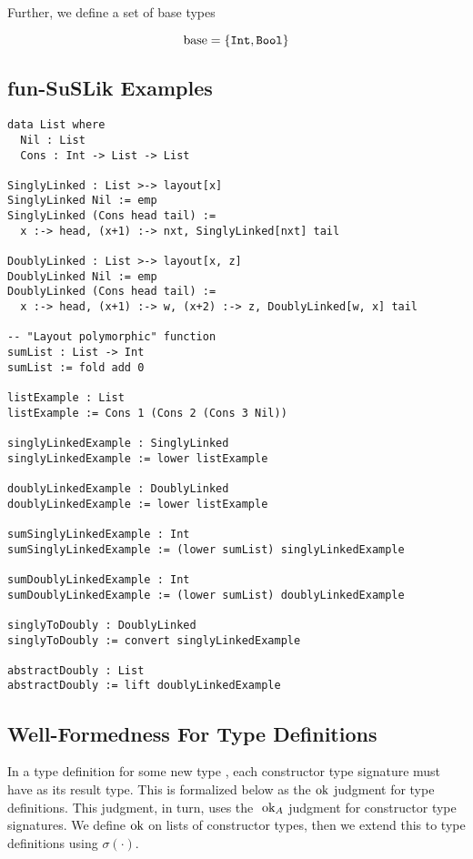\documentclass[10pt]{article}
\begin{document}
Further, we define a set of base types

\[
  \textnormal{base} = \{\texttt{Int}, \texttt{Bool}\}
\]

\subsection{fun-SuSLik Examples}

\begin{lstlisting}
data List where
  Nil : List
  Cons : Int -> List -> List

SinglyLinked : List >-> layout[x]
SinglyLinked Nil := emp
SinglyLinked (Cons head tail) :=
  x :-> head, (x+1) :-> nxt, SinglyLinked[nxt] tail

DoublyLinked : List >-> layout[x, z]
DoublyLinked Nil := emp
DoublyLinked (Cons head tail) := 
  x :-> head, (x+1) :-> w, (x+2) :-> z, DoublyLinked[w, x] tail

-- "Layout polymorphic" function
sumList : List -> Int
sumList := fold add 0

listExample : List
listExample := Cons 1 (Cons 2 (Cons 3 Nil))

singlyLinkedExample : SinglyLinked
singlyLinkedExample := lower listExample

doublyLinkedExample : DoublyLinked
doublyLinkedExample := lower listExample

sumSinglyLinkedExample : Int
sumSinglyLinkedExample := (lower sumList) singlyLinkedExample

sumDoublyLinkedExample : Int
sumDoublyLinkedExample := (lower sumList) doublyLinkedExample

singlyToDoubly : DoublyLinked
singlyToDoubly := convert singlyLinkedExample

abstractDoubly : List
abstractDoubly := lift doublyLinkedExample
\end{lstlisting}

\subsection{Well-Formedness For Type Definitions}

In a type definition for some new type , each constructor type signature must have  as its result type. This is
formalized below as the$\textnormal{ ok}$ judgment for type definitions. This judgment, in turn, uses the $\textnormal{ ok}_A$ judgment for constructor
type signatures. We define$\textnormal{ ok}$ on lists of constructor types, then we extend this to type definitions using $\sigma(\cdot)$.
\end{document}
